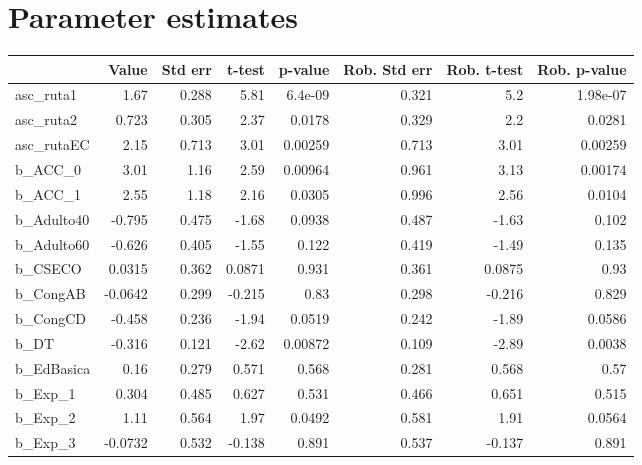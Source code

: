 \section{Parameter estimates}
\begin{tabular}{lrrrrrrr}
\toprule
{} &   Value &  Std err &    t-test &  p-value &  Rob. Std err &  Rob. t-test &  Rob. p-value \\
\midrule
asc\_ruta1     &    1.67 &    0.288 &      5.81 &  6.4e-09 &         0.321 &          5.2 &      1.98e-07 \\
asc\_ruta2     &   0.723 &    0.305 &      2.37 &   0.0178 &         0.329 &          2.2 &        0.0281 \\
asc\_rutaEC    &    2.15 &    0.713 &      3.01 &  0.00259 &         0.713 &         3.01 &       0.00259 \\
b\_ACC\_0       &    3.01 &     1.16 &      2.59 &  0.00964 &         0.961 &         3.13 &       0.00174 \\
b\_ACC\_1       &    2.55 &     1.18 &      2.16 &   0.0305 &         0.996 &         2.56 &        0.0104 \\
b\_Adulto40    &  -0.795 &    0.475 &     -1.68 &   0.0938 &         0.487 &        -1.63 &         0.102 \\
b\_Adulto60    &  -0.626 &    0.405 &     -1.55 &    0.122 &         0.419 &        -1.49 &         0.135 \\
b\_CSECO       &  0.0315 &    0.362 &    0.0871 &    0.931 &         0.361 &       0.0875 &          0.93 \\
b\_CongAB      & -0.0642 &    0.299 &    -0.215 &     0.83 &         0.298 &       -0.216 &         0.829 \\
b\_CongCD      &  -0.458 &    0.236 &     -1.94 &   0.0519 &         0.242 &        -1.89 &        0.0586 \\
b\_DT          &  -0.316 &    0.121 &     -2.62 &  0.00872 &         0.109 &        -2.89 &        0.0038 \\
b\_EdBasica    &    0.16 &    0.279 &     0.571 &    0.568 &         0.281 &        0.568 &          0.57 \\
b\_Exp\_1       &   0.304 &    0.485 &     0.627 &    0.531 &         0.466 &        0.651 &         0.515 \\
b\_Exp\_2       &    1.11 &    0.564 &      1.97 &   0.0492 &         0.581 &         1.91 &        0.0564 \\
b\_Exp\_3       & -0.0732 &    0.532 &    -0.138 &    0.891 &         0.537 &       -0.137 &         0.891 \\

\end{tabular}
